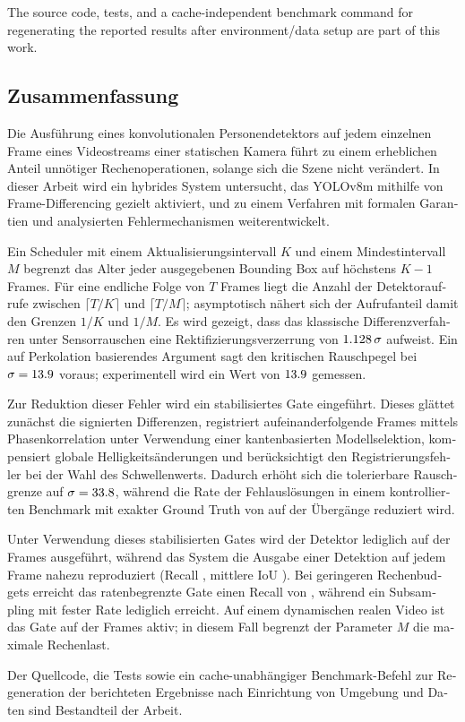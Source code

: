 \documentclass[12pt,a4paper]{article}
\theoremstyle{plain}
\theoremstyle{definition}
\begin{document}
The source code, tests, and a cache-independent benchmark command for regenerating the reported results after environment/data setup are part of this work.

\newpage
\begin{otherlanguage}{ngerman}
\section*{Zusammenfassung}

Die Ausführung eines konvolutionalen Personendetektors auf jedem einzelnen Frame eines Videostreams einer statischen Kamera führt zu einem erheblichen Anteil unnötiger Rechenoperationen, solange sich die Szene nicht verändert. In dieser Arbeit wird ein hybrides System untersucht, das YOLOv8m mithilfe von Frame-Differencing gezielt aktiviert, und zu einem Verfahren mit formalen Garantien und analysierten Fehlermechanismen weiterentwickelt.

Ein Scheduler mit einem Aktualisierungsintervall $K$ und einem Mindestintervall $M$ begrenzt das Alter jeder ausgegebenen Bounding Box auf höchstens $K-1$ Frames. Für eine endliche Folge von $T$ Frames liegt die Anzahl der Detektoraufrufe zwischen $\lceil T/K\rceil$ und $\lceil T/M\rceil$; asymptotisch nähert sich der Aufrufanteil damit den Grenzen $1/K$ und $1/M$. Es wird gezeigt, dass das klassische Differenzverfahren unter Sensorrauschen eine Rektifizierungsverzerrung von $1.128\,\sigma$ aufweist. Ein auf Perkolation basierendes Argument sagt den kritischen Rauschpegel bei $\sigma=13.9$ voraus; experimentell wird ein Wert von $13.9$ gemessen.

Zur Reduktion dieser Fehler wird ein stabilisiertes Gate eingeführt. Dieses glättet zunächst die signierten Differenzen, registriert aufeinanderfolgende Frames mittels Phasenkorrelation unter Verwendung einer kantenbasierten Modellselektion, kompensiert globale Helligkeitsänderungen und berücksichtigt den Registrierungsfehler bei der Wahl des Schwellenwerts. Dadurch erhöht sich die tolerierbare Rauschgrenze auf $\sigma=33.8$, während die Rate der Fehlauslösungen in einem kontrollierten Benchmark mit exakter Ground Truth von \GateFprFD{} auf \GateFprFDS{} der Übergänge reduziert wird.

Unter Verwendung dieses stabilisierten Gates wird der Detektor lediglich auf \PolRatioFDS{} der Frames ausgeführt, während das System die Ausgabe einer Detektion auf jedem Frame nahezu reproduziert (Recall \PolRecallFDS, mittlere IoU \PolIouFDS). Bei geringeren Rechenbudgets erreicht das ratenbegrenzte Gate einen Recall von \PolRecallFDSMFour{}, während ein Subsampling mit fester Rate lediglich \FixedRecallAtFDSMFour{} erreicht. Auf einem dynamischen realen Video ist das Gate auf \VtActiveFDS{} der Frames aktiv; in diesem Fall begrenzt der Parameter $M$ die maximale Rechenlast.

Der Quellcode, die Tests sowie ein cache-unabhängiger Benchmark-Befehl zur Regeneration der berichteten Ergebnisse nach Einrichtung von Umgebung und Daten sind Bestandteil der Arbeit.

\end{otherlanguage}
\end{document}
